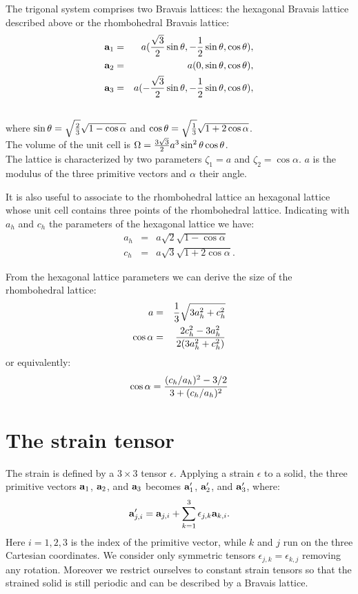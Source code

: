 \documentclass[12pt,a4paper,twoside]{report}
\begin{document}
The trigonal system comprises two Bravais lattices: the hexagonal Bravais 
lattice described above or the rhombohedral Bravais lattice:
\begin{eqnarray}
{\bf a}_1 &=& a ({\sqrt{3}\over 2}\sin{\theta}, -{1\over 2} \sin{\theta},
          \cos{\theta}), 
\nonumber \\
{\bf a}_2 &=& a (0, \sin{\theta}, \cos{\theta}), 
\nonumber \\
{\bf a}_3 &=& a (-{\sqrt{3}\over 2} \sin{\theta}, -{1\over 2} \sin{\theta},
         \cos{\theta}), 
\nonumber \\
\nonumber
\end{eqnarray}
where $\sin{\theta}=\sqrt{2\over 3}\sqrt{1-\cos{\alpha}}$
and $\cos{\theta}=\sqrt{1\over 3}\sqrt{1 + 2 \cos{\alpha}}$. \\
The volume of the unit cell is $\Omega={3 \sqrt{3} \over 2} a^3 \sin^2\theta
\cos\theta$. \\
The lattice is characterized by two parameters $\zeta_1=a$ and 
$\zeta_2=\cos\alpha$. $a$ is the modulus of the three primitive vectors 
and $\alpha$ their angle.

It is also useful to associate to the rhombohedral lattice an hexagonal 
lattice whose unit cell contains three points of the rhombohedral lattice.
Indicating with $a_h$ and $c_h$ the parameters of the hexagonal lattice we
have:
\begin{eqnarray}
a_h&=&a \sqrt{2} \sqrt{1-\cos\alpha} \\
c_h&=&a \sqrt{3} \sqrt{1+2\cos\alpha}.
\end{eqnarray}

From the hexagonal lattice parameters we can derive the size of
the rhombohedral lattice:
\begin{eqnarray}
a&=& {1\over 3} \sqrt{3 a_h^2 + c_h^2} \\
\cos\alpha&=&{2 c_h^2-3 a_h^2 \over 2 ( 3 a_h^2+c_h^2)}
\end{eqnarray}
or equivalently:
\begin{equation}
\cos\alpha={ (c_h/a_h)^2-3/2 \over  3 +(c_h/a_h)^2}
\end{equation}

\newpage

{\color{dark-blue}\chapter{The strain tensor}}
\color{black}

The strain is defined by a $3\times 3$ tensor
$\epsilon$. Applying a strain $\epsilon$ to a solid, 
the three primitive vectors ${\bf a}_1$, ${\bf a}_2$, and ${\bf a}_3$
becomes 
${\bf a}'_1$, ${\bf a}'_2$, and ${\bf a}'_3$, where:
\begin{equation}
{\bf a}'_{j,i} = {\bf a}_{j,i} +  \sum_{k=1}^3 \epsilon_{j,k} {\bf a}_{k,i}.
\label{strain_def}
\end{equation}
Here $i=1,2,3$ is the index of the primitive vector, while $k$ and $j$ run
on the three Cartesian coordinates. We consider only symmetric 
tensors $\epsilon_{j,k}=\epsilon_{k,j}$ removing any rotation. Moreover
we restrict ourselves to constant strain tensors so that the strained
solid is still periodic and can be described by a Bravais lattice.
\end{document}
